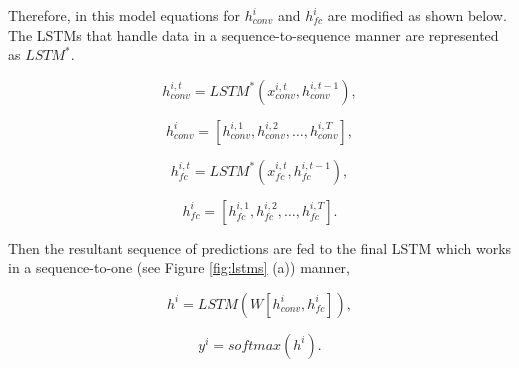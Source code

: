 \documentclass[10pt,twocolumn,letterpaper]{article}
\begin{document}
 Therefore, in this model equations for $h^i_{conv}$  and $h^i_{fc}$ are modified as shown below. The LSTMs that handle data in a sequence-to-sequence manner are represented as $LSTM^*$.


\begin{equation}
h^{i,t}_{conv}=LSTM^*(x^{i,t}_{conv}, h^{i,t-1}_{conv} ),
\label{eq:8}
\end{equation}

\begin{equation}
h^{i}_{conv}=[h^{i,1}_{conv},h^{i,2}_{conv}, \ldots,h^{i,T}_{conv}],
\label{eq:9}
\end{equation}

\begin{equation}
h^{i,t}_{fc}=LSTM^*(x^{i,t}_{fc}, h^{i,t-1}_{fc} ),
\label{eq:10}
\end{equation}

\begin{equation}
h^{i}_{fc}=[h^{i,1}_{fc},h^{i,2}_{fc}, \ldots,h^{i,T}_{fc}].
\label{eq:11}
\end{equation}

Then the resultant sequence of predictions are fed to the final LSTM which works in a sequence-to-one (see Figure \ref{fig:lstms} (a)) manner,

\begin{equation}
h^{i}= LSTM(W [h^i_{conv},h^i_{fc}]),
\label{eq:12}
\end{equation}

\begin{equation}
y^i=softmax(h^{i}).
\label{eq:13}
\end{equation}
\end{document}
